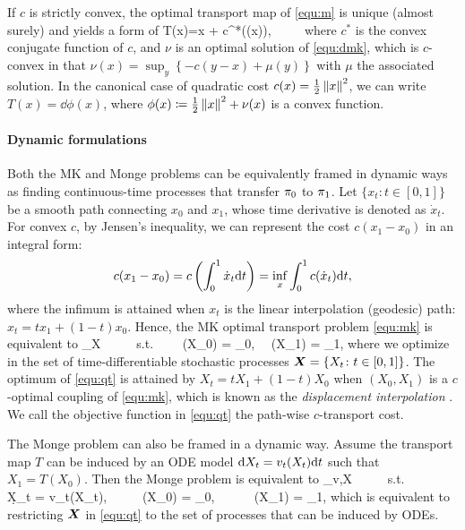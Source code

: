 If $c$ is strictly convex, 
the %
optimal transport map of \eqref{equ:m} 
is unique (almost surely) and yields a form of 
\bb %
T(x)=x + \dd c^*(\dd \nu(x)), ~~~~
\ee 
where $c^*$ is the convex conjugate function of $c$, and $\nu$ is an optimal solution of \eqref{equ:dmk}, which is  $c$-convex in that $\nu(x) =  \sup_{y}\left \{ -c(y-x) +  \mu(y)\right \}$ with $\mu$ the associated solution. 
In the canonical case of quadratic cost  $c(x) = \frac{1}{2}\left\lVert x\right\rVert^2$, we can write $T(x) = \dd \phi(x)$, where $\phi(x) \coloneqq \frac{1}{2}\left\lVert x\right\rVert^2 + \nu(x)$ is a convex function. 



\paragraph{Dynamic  formulations} 
Both the MK and Monge problems can be equivalently framed in dynamic ways 
as finding continuous-time processes that transfer ${\pi}_0$ to ${\pi}_1$.  
Let $\{x_t \colon t\in[0,1]\}$ be a smooth path connecting $x_0$ and $x_1$, whose time derivative is denoted as $\dot x_t$. 
For convex $c$, by Jensen's inequality, we can represent the cost $c(x_1-x_0)$ in an integral form: 
$$
c({x_1 - x_0}) = c\left (\int_0^1 \dot x_t \mathrm{d}t \right) =  \inf_{x} \int_0^1 c({\dot x_t}) \mathrm{d}t,
$$
where the infimum is attained when $x_t$ is the  linear interpolation (geodesic) path:  $x_t = t x_1 + (1-t)x_0$. 
Hence, the MK optimal transport problem \eqref{equ:mk} is equivalent to 
\bbb \label{equ:qt}
\inf_{\vv X}  
\E{}  ~~~~~s.t.~~~~ \law(X_0) = \tg_0, ~~\law(X_1) = \tg_1,
\eee 
where we optimize in the set of  time-differentiable %
stochastic processes 
${\boldsymbol{X}} = \{X_t \colon t\in[0,1]\}$.
The optimum of \eqref{equ:qt} 
is attained by  $X_t = t X_1 + (1-t)X_0$ when
 $(X_0,X_1)$ is a $c$-optimal coupling of \eqref{equ:mk}, which is known as the \emph{displacement interpolation}  \citep{mccann1997convexity}. 
 We call the objective function in \eqref{equ:qt} the path-wise $c$-transport cost. 

The Monge problem can also be framed in a dynamic way. 
Assume the transport map $T$ can be induced by an ODE model 
$\mathrm{d} X_t = v_t(X_t)\mathrm{d}t $ such that $X_1 = T(X_0)$. Then the Monge problem is equivalent to %
\bbb \label{equ:cm}
\inf_{v,\traj X} \E{} ~~~~~s.t.~~~~~ \d X_t = v_t(X_t)\dt ,~~~~~
\law(X_0) = \tg_0, ~~~~~ \law(X_1) = \tg_1, 
\eee 
which is equivalent to restricting ${\boldsymbol{X}}$  in \eqref{equ:qt} to the set of processes that can be induced by ODEs. 

